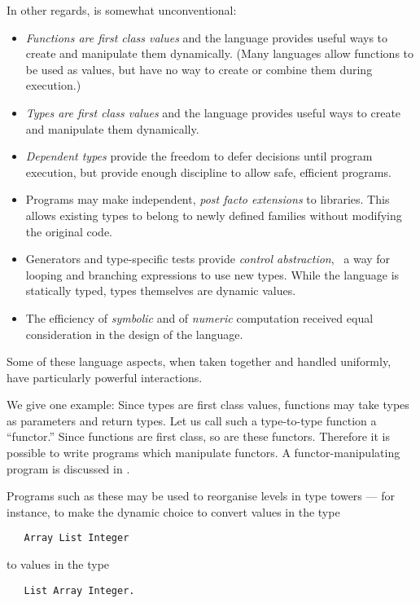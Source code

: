 In other regards, \asharp{} is somewhat unconventional:
\begin{itemize}
\item 
  {\em Functions are first class values}
  and the language provides
  useful ways to create and manipulate them dynamically. 
  (Many languages allow functions to be used as values,
  but have no way to create or combine them during execution.)
\item
  {\em Types are first class values} and the language 
  provides useful ways to create and manipulate them dynamically.
\item
  {\em Dependent types} provide the freedom to defer decisions until
  program execution, but provide enough discipline to allow
  safe, efficient programs.
\item
  Programs may make independent, {\em post facto extensions} to libraries.
  This allows existing types to belong to newly defined families
  without modifying the original code.
\item
  Generators and type-specific tests provide {\em control abstraction}, 
  \ie{}~a way for looping and branching expressions to use new types.
  While the language is statically typed,
  types themselves are dynamic values.
\item
  The efficiency of {\em symbolic} and of {\em numeric} computation
  received equal consideration in the design of the language.
\end{itemize}

Some of these language aspects, when taken together and handled uniformly,
have particularly powerful interactions.  

We give one example:
Since types are first class values, functions may 
take types as parameters and return types.  
Let us call such a type-to-type function a ``functor.''
Since functions are first class,  so are these functors.
Therefore it is possible to write programs which manipulate functors.
A functor-manipulating program is discussed in .

Programs such as these may be used to reorganise levels in type towers ---
for instance, to make the dynamic choice to convert values in the type
\begin{verbatim}
   Array List Integer
\end{verbatim}
to values in the type
\begin{verbatim}
   List Array Integer.
\end{verbatim}


